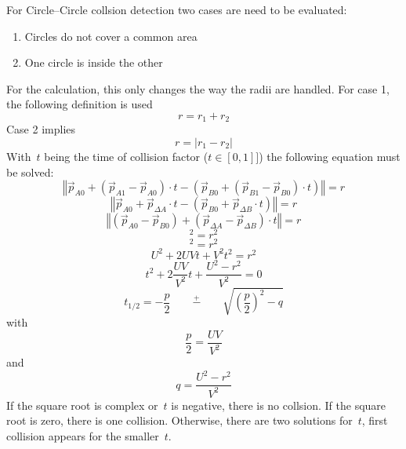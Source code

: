 \documentclass[a4paper,10pt]{scrartcl}
\newcommand{\abs}[1]{\vert{#1}\vert}
\newcommand{\norm}[1]{\left\Vert {#1} \right\Vert}
\begin{document}
\noindent
For Circle--Circle collsion detection two cases are need to be
evaluated:
\begin{enumerate}
    \item Circles do not cover a common area
    \item One circle is inside the other
\end{enumerate}
For the calculation, this only changes the way the radii are
handled. For case 1, the following definition is used
\begin{equation}
    r = r_1+r_2
\end{equation}
Case 2 implies
\begin{equation}
    r = \abs{r_1-r_2}
\end{equation}
With~$t$ being the time of collision factor ($t \in [0,1]]$) the following equation must be solved:
\begin{equation}
    \norm{\vec{p}_{A0} + ( \vec{p}_{A1} - \vec{p}_{A0} ) \cdot t -
    (
    \vec{p}_{B0} + ( \vec{p}_{B1} - \vec{p}_{B0} ) \cdot t
    )
    }
    = r
\end{equation}
\begin{equation}
    \norm{\vec{p}_{A0} + \vec{p}_{\Delta A} \cdot t -
    (
    \vec{p}_{B0} + \vec{p}_{\Delta B} \cdot t
    )
    }
    = r
\end{equation}
\begin{equation}
    \norm{(\vec{p}_{A0} - \vec{p}_{B0}) +
    (
     \vec{p}_{\Delta A} - \vec{p}_{\Delta B}
    )
    \cdot t
    }
    = r
\end{equation}
\begin{equation}
    [(\vec{p}_{A0} - \vec{p}_{B0}) +
    (
     \vec{p}_{\Delta A} - \vec{p}_{\Delta B}
    )
    \cdot t
    ]^2
    = r^2
\end{equation}
\begin{equation}
    [U + V \cdot t]^2
    = r^2
\end{equation}
\begin{equation}
    U^2 + 2 UVt + V^2 t^2
    = r^2
\end{equation}
\begin{equation}
    t^2 + 2\frac{UV}{V^2} t + \frac{U^2-r^2}{V^2} = 0
\end{equation}
\begin{equation}
    t_{1/2} = -\frac{p}{2} \qquad\stackrel{+}{-} \qquad\sqrt{\left(\frac{p}{2}\right)^2 - q}
\end{equation}
with
\begin{equation}
    \frac{p}{2} = \frac{UV}{V^2}
\end{equation}
and
\begin{equation}
    q = \frac{U^2-r^2}{V^2}
\end{equation}
If the square root is complex or~$t$ is negative, there is no collsion. If the square root is zero,
there is one collision.
Otherwise, there are two solutions for~$t$, first collision appears for the smaller~$t$.
\end{document}
